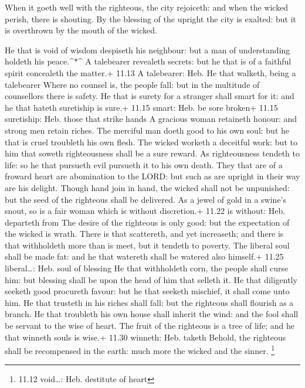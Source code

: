  When it goeth well with the righteous, the city rejoiceth:
and when the wicked perish, there is shouting.  By the
blessing of the upright the city is exalted: but it is overthrown by the
mouth of the wicked.

 He that is void of wisdom despiseth his neighbour: but a
man of understanding holdeth his peace.\^{}*\^{}  A
talebearer revealeth secrets: but he that is of a faithful spirit
concealeth the matter.+ 11.13 A talebearer: Heb. He that walketh, being
a talebearer  Where no counsel is, the people fall: but in
the multitude of counsellors there is safety.  He that is
surety for a stranger shall smart for it: and he that hateth suretiship
is sure.+ 11.15 smart: Heb. be sore broken+ 11.15 suretiship: Heb. those
that strike hands  A gracious woman retaineth honour: and
strong men retain riches.  The merciful man doeth good to
his own soul: but he that is cruel troubleth his own flesh.
 The wicked worketh a deceitful work: but to him that
soweth righteousness shall be a sure reward.  As
righteousness tendeth to life: so he that pursueth evil pursueth it to
his own death.  They that are of a froward heart are
abomination to the LORD: but such as are upright in their way are his
delight.  Though hand join in hand, the wicked shall not be
unpunished: but the seed of the righteous shall be delivered.
 As a jewel of gold in a swine's snout, so is a fair woman
which is without discretion.+ 11.22 is without: Heb. departeth from
 The desire of the righteous is only good: but the
expectation of the wicked is wrath.  There is that
scattereth, and yet increaseth; and there is that withholdeth more than
is meet, but it tendeth to poverty.  The liberal soul shall
be made fat: and he that watereth shall be watered also himself.+ 11.25
liberal\ldots: Heb. soul of blessing  He that withholdeth
corn, the people shall curse him: but blessing shall be upon the head of
him that selleth it.  He that diligently seeketh good
procureth favour: but he that seeketh mischief, it shall come unto him.
 He that trusteth in his riches shall fall: but the
righteous shall flourish as a branch.  He that troubleth
his own house shall inherit the wind: and the fool shall be servant to
the wise of heart.  The fruit of the righteous is a tree of
life; and he that winneth souls is wise.+ 11.30 winneth: Heb. taketh
 Behold, the righteous shall be recompensed in the earth:
much more the wicked and the sinner. \footnote{11.12 void\ldots: Heb.
  destitute of heart}

